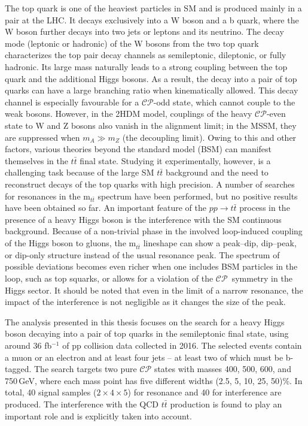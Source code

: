 The top quark is one of the heaviest particles in SM and is produced mainly in a pair at the LHC. It decays exclusively into a W boson and a b quark, where the W boson further decays into two jets or leptons and its neutrino. The decay mode (leptonic or hadronic) of the W bosons from the two top quark characterizes the top pair decay channels as semileptonic, dileptonic, or fully hadronic.  
Its large mass naturally leads to a strong coupling between the top quark and the additional Higgs bosons. As a result, the decay into a pair of top quarks can have a large branching ratio when kinematically allowed.
This decay channel is especially favourable for a $\mathcal{CP}$-odd state, which cannot couple to the weak bosons.
However, in the 2HDM model, couplings of the heavy $\mathcal{CP}$-even state to W and Z bosons also vanish in the alignment limit; in the MSSM, they are suppressed when $m_A \gg m_Z$ (the decoupling limit).
Owing to this and other factors, various theories beyond the standard model (BSM) can manifest themselves in the $t\bar t$ final state.
Studying it experimentally, however, is a challenging task because of the large SM $t\bar t$ background and the need to reconstruct decays of the top quarks with high precision.
A number of searches for resonances in the m$_{t\bar t}$ spectrum have been performed, but no positive results have been obtained so far.
An important feature of the $pp \rightarrow t\bar t$ process in the presence of a heavy Higgs boson is the interference with the SM continuous background.
Because of a non-trivial phase in the involved loop-induced coupling of the Higgs boson to gluons, the m$_{t\bar t}$ lineshape can show a peak–dip, dip–peak, or dip-only structure instead of the usual resonance peak.
The spectrum of possible deviations becomes even richer when one includes BSM particles in the loop, such as top squarks, or allows for a violation of the $\mathcal{CP}$~symmetry in the Higgs sector.
It should be noted that even in the limit of a narrow resonance, the impact of the interference is not negligible as it changes the size of the peak.

The analysis presented in this thesis focuses on the search for a heavy Higgs boson decaying into a pair of top quarks in the semileptonic final state, using around 36 fb$^{-1}$ of pp collision data collected in 2016. The selected events contain a muon or an electron and at least four jets – at least two of which must be b-tagged.
The search targets two pure $\mathcal{CP}$ states with masses 400, 500, 600, and 750\,GeV, where each mass point has five different widths (2.5, 5, 10, 25, 50)\%. In total, 40 signal samples ($2\times 4\times 5$) for resonance and 40 for interference are produced. The interference with the QCD $t\bar t$ production is found to play an important role and is explicitly taken into account. 

